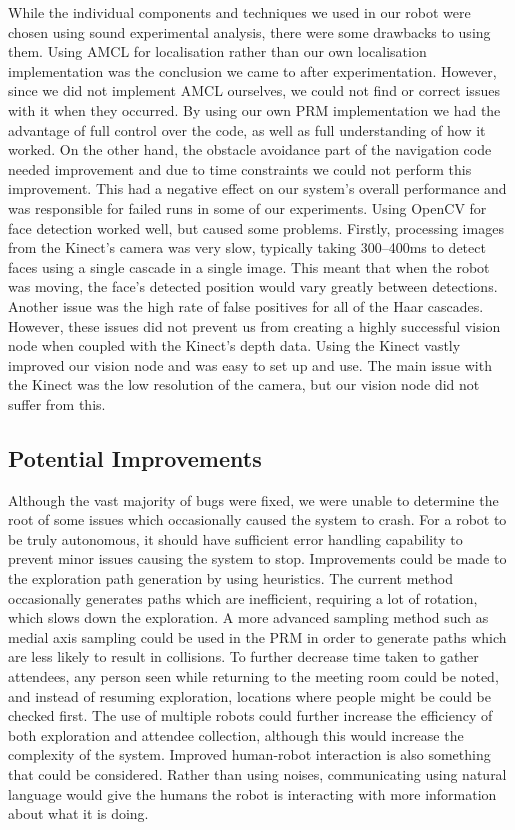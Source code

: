 \documentclass[conference]{IEEEtran}
\begin{document}
While the individual components and techniques we used in our robot were chosen using sound experimental analysis, there were some drawbacks to using them. Using AMCL for localisation rather than our own localisation implementation was the conclusion we came to after experimentation. However, since we did not implement AMCL ourselves, we could not find or correct issues with it when they occurred. By using our own PRM implementation we had the advantage of full control over the code, as well as full understanding of how it worked. On the other hand, the obstacle avoidance part of the navigation code needed improvement and due to time constraints we could not perform this improvement. This had a negative effect on our system's overall performance and was responsible for failed runs in some of our experiments. Using OpenCV for face detection worked well, but caused some problems. Firstly, processing images from the Kinect's camera was very slow, typically taking 300--400ms to detect faces using a single cascade in a single image. This meant that when the robot was moving, the face's detected position would vary greatly between detections. Another issue was the high rate of false positives for all of the Haar cascades. However, these issues did not prevent us from creating a highly successful vision node when coupled with the Kinect's depth data. Using the Kinect vastly improved our vision node and was easy to set up and use. The main issue with the Kinect was the low resolution of the camera, but our vision node did not suffer from this.

\subsection{Potential Improvements}
Although the vast majority of bugs were fixed, we were unable to determine the root of some issues which occasionally caused the system to crash. For a robot to be truly autonomous, it should have sufficient error handling capability to prevent minor issues causing the system to stop. Improvements could be made to the exploration path generation by using heuristics. The current method occasionally generates paths which are inefficient, requiring a lot of rotation, which slows down the exploration. A more advanced sampling method such as medial axis sampling could be used in the PRM in order to generate paths which are less likely to result in collisions. To further decrease time taken to gather attendees, any person seen while returning to the meeting room could be noted, and instead of resuming exploration, locations where people might be could be checked first. The use of multiple robots could further increase the efficiency of both exploration and attendee collection, although this would increase the complexity of the system. Improved human-robot interaction is also something that could be considered. Rather than using noises, communicating using natural language would give the humans the robot is interacting with more information about what it is doing.
\end{document}
